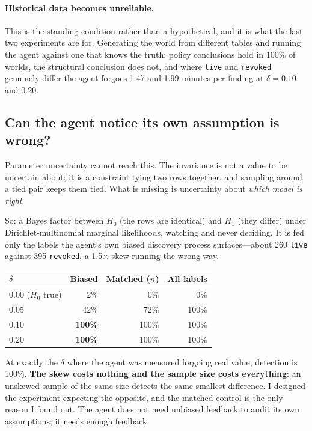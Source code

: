 \documentclass{article}
\begin{document}
\paragraph{Historical data becomes unreliable.} This is the standing condition
rather than a hypothetical, and it is what the last two experiments are for.
Generating the world from different tables and running the agent against one that
knows the truth: policy conclusions hold in 100\% of worlds, the structural
conclusion does not, and where \texttt{live} and \texttt{revoked} genuinely differ
the agent forgoes 1.47 and 1.99 minutes per finding at $\delta = 0.10$ and
$0.20$.

\subsection{Can the agent notice its own assumption is wrong?}

Parameter uncertainty cannot reach this. The invariance is not a value to be
uncertain about; it is a constraint tying two rows together, and sampling around
a tied pair keeps them tied. What is missing is uncertainty about \emph{which
model is right}.

So: a Bayes factor between $H_0$ (the rows are identical) and $H_1$ (they differ)
under Dirichlet-multinomial marginal likelihoods, watching and never deciding. It
is fed only the labels the agent's own biased discovery process surfaces---about
260 \texttt{live} against 395 \texttt{revoked}, a 1.5$\times$ skew running the
wrong way.

\begin{center}
\small
\begin{tabular}{@{}lrrr@{}}
\toprule
$\delta$ & Biased & Matched ($n$) & All labels \\
\midrule
0.00 ($H_0$ true) & 2\% & 0\% & 0\% \\
0.05 & 42\% & 72\% & 100\% \\
0.10 & \textbf{100\%} & 100\% & 100\% \\
0.20 & \textbf{100\%} & 100\% & 100\% \\
\bottomrule
\end{tabular}
\end{center}

At exactly the $\delta$ where the agent was measured forgoing real value,
detection is 100\%. \textbf{The skew costs nothing and the sample size costs
everything}: an unskewed sample of the same size detects the same smallest
difference. I designed the experiment expecting the opposite, and the matched
control is the only reason I found out. The agent does not need unbiased feedback
to audit its own assumptions; it needs enough feedback.
\end{document}
